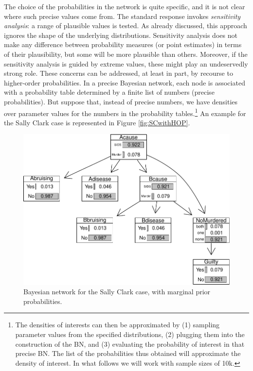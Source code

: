\documentclass[
  10pt,
  dvipsnames,enabledeprecatedfontcommands]{scrartcl}
\begin{document}
The choice of the probabilities in the network is quite specific, and it
is not clear where such precise values come from. The standard response
invokes \emph{sensitivity analysis}: a range of plausible values is
tested. As already discussed, this approach ignores the shape of the
underlying distributions. Sensitivity analysis does not make any
difference between probability measures (or point estimates) in terms of
their plausibility, but some will be more plausible than others.
Moreover, if the sensitivity analysis is guided by extreme values, these
might play an undeservedly strong role. These concerns can be addressed,
at least in part, by recourse to higher-order probabilities. In a
precise Bayesian network, each node is associated with a probability
table determined by a finite list of numbers (precise probabilities).
But suppose that, instead of precise numbers, we have densities over
parameter values for the numbers in the probability tables.\footnote{The
  densities of interests can then be approximated by (1) sampling
  parameter values from the specified distributions, (2) plugging them
  into the construction of the BN, and (3) evaluating the probability of
  interest in that precise BN. The list of the probabilities thus
  obtained will approximate the density of interest. In what follows we
  will work with sample sizes of 10k.} An example for the Sally Clark
case is represented in Figure \ref{fig:SCwithHOP}.

\begin{figure}[H]

\begin{center}\includegraphics[width=0.5\linewidth]{imprecision_philosophical_paper2_files/figure-latex/scBNplot2-1} \end{center}
\caption{Bayesian network for the Sally Clark case, with marginal prior probabilities.}
\label{fig:scBNplot}
\end{figure}
\end{document}
